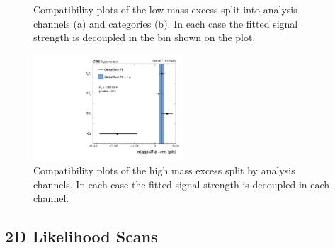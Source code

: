\begin{figure}[!hbtp]
\centering
\caption{Compatibility plots of the low mass excess split into analysis channels (a) and categories (b). In each case the fitted signal strength is decoupled in the bin shown on the plot.}
\label{fig:low_mass_compatibility}
\end{figure}

\begin{figure}[!hbtp]
\centering
    \includegraphics[width=0.5\textwidth]{Figures/ccc_fit_result_mH1200_per-channel.pdf}
\caption{Compatibility plots of the high mass excess split by analysis channels. In each case the fitted signal strength is decoupled in each channel.}
\label{fig:high_mass_compatibility}
\end{figure}

\subsection{2D Likelihood Scans}

